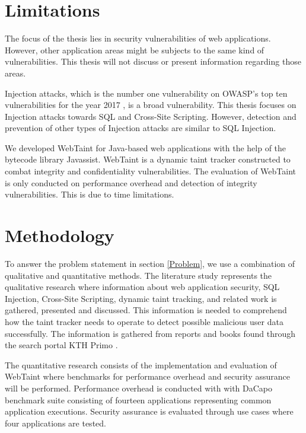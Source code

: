 \section{Limitations}
\label{Delimitations}
The focus of the thesis lies in security vulnerabilities of web applications. However, other application areas might be subjects to the same kind of vulnerabilities. This thesis will not discuss or present information regarding those areas. 

Injection attacks, which is the number one vulnerability on OWASP's top ten vulnerabilities for the year 2017 \parencite{OWASP2017}, is a broad vulnerability. This thesis focuses on Injection attacks towards SQL and Cross-Site Scripting. However, detection and prevention of other types of Injection attacks are similar to SQL Injection.

We developed WebTaint for Java-based web applications with the help of the bytecode library Javassist. WebTaint is a dynamic taint tracker constructed to combat integrity and confidentiality vulnerabilities. The evaluation of WebTaint is only conducted on performance overhead and detection of integrity vulnerabilities. This is due to time limitations.



\section{Methodology}
\label{Methodology}
To answer the problem statement in section \ref{Problem}, we use a combination of qualitative and quantitative methods. The literature study represents the qualitative research where information about web application security, SQL Injection, Cross-Site Scripting, dynamic taint tracking, and related work is gathered, presented and discussed. This information is needed to comprehend how the taint tracker needs to operate to detect possible malicious user data successfully. The information is gathered from reports and books found through the search portal KTH Primo \parencite{primo}.

The quantitative research consists of the implementation and evaluation of WebTaint where benchmarks for performance overhead and security assurance will be performed. Performance overhead is conducted with with DaCapo \parencite{dacapo} benchmark suite consisting of fourteen applications representing common application executions. Security assurance is evaluated through use cases where four applications are tested.



